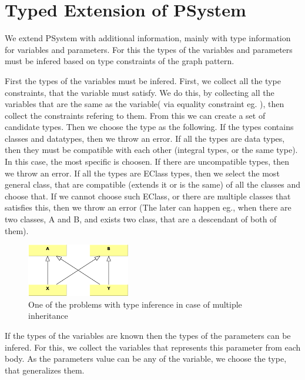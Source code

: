 \section{Typed Extension of PSystem}

We extend PSystem with additional information, mainly with type information for variables and parameters.
For this the types of the variables and parameters must be infered based on type constraints of the graph pattern.

First the types of the variables must be infered. 
First, we collect all the type constraints, that the variable must satisfy.
We do this, by collecting all the variables that are the same as the variable( via equality constraint eg. ), 
then collect the constraints refering to them.
From this we can create a set of candidate types.
Then we choose the type as the following. 
If the types contains classes and datatypes, then we throw an error.
If all the types are data types, then they must be compatible with each other (integral types, or the same type).
In this case, the most specific is choosen. If there are uncompatible types, then we throw an error.
If all the types are EClass types, then we select the most general class, that are compatible (extends it or is the same) of all the classes and choose that.
If we cannot choose such EClass, or there are multiple classes that satisfies this, then we throw an error (The later can happen eg., when there are two classes, A and B, and exists two class, that are a descendant of both of them).

\begin{figure}[h]
	\begin{center}
		\includegraphics[width=0.4\textwidth]{figures/multiple-inheritance-problem.pdf}
		\caption{One of the problems with type inference in case of multiple inheritance}
		\label{fig:multiple-inheritance-problem}
	\end{center}
\end{figure}

If the types of the variables are known then the types of the parameters can be infered. 
For this, we collect the variables that represents this parameter from each body.
As the parameters value can be any of the variable, we choose the type, that generalizes them.

